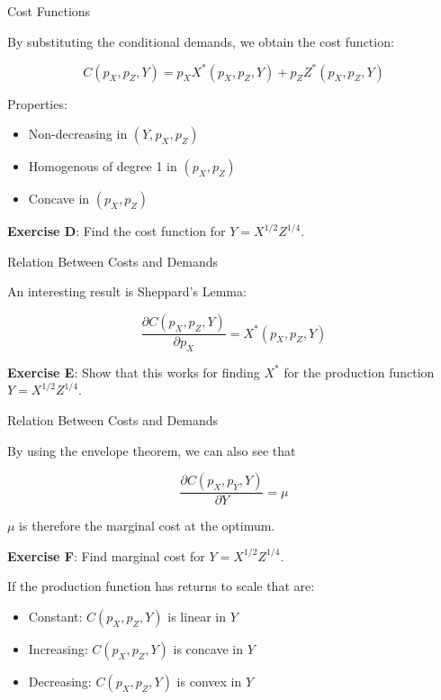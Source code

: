 \documentclass[handout]{beamer}
\begin{document}
\begin{frame}{Cost Functions} 

By substituting the conditional demands, we obtain the cost function: 

$$ C(p_X,p_Z,Y) = p_X X^*(p_X,p_Z,Y) + p_Z Z^*(p_X,p_Z,Y) $$

Properties:
\begin{itemize}
\item Non-decreasing in $(Y,p_X,p_Z)$
\item Homogenous of degree 1 in $(p_X,p_Z)$
\item Concave in $(p_X,p_Z)$
\end{itemize}


\textbf{Exercise D}: Find the cost function for $Y=X^{1/2} Z^{1/4}$.


\end{frame}


\begin{frame}{Relation Between Costs and Demands} 

An interesting result is Sheppard's Lemma: 

$$ \frac{\partial C(p_X,p_Z,Y)}{\partial p_X} = X^*(p_X,p_Z,Y) $$

\textbf{Exercise E}: Show that this works for finding $X^*$ for the production function  $Y=X^{1/2} Z^{1/4}$.

\end{frame}

\begin{frame}{Relation Between Costs and Demands} 

By using the envelope theorem, we can also see that 

$$ \frac{\partial C(p_X,p_Y,Y)}{\partial Y} = \mu $$

$\mu$ is therefore the marginal cost at the optimum. 

\textbf{Exercise F}: Find marginal cost for $Y=X^{1/2} Z^{1/4}$.

\vspace{0.5in}

If the production function has returns to scale that are:

\begin{itemize}
\item Constant: $C(p_X,p_Z,Y)$ is linear in $Y$
\item Increasing: $C(p_X,p_Z,Y)$ is concave in $Y$
\item Decreasing: $C(p_X,p_Z,Y)$ is convex in $Y$
\end{itemize}


\end{frame}
\end{document}
